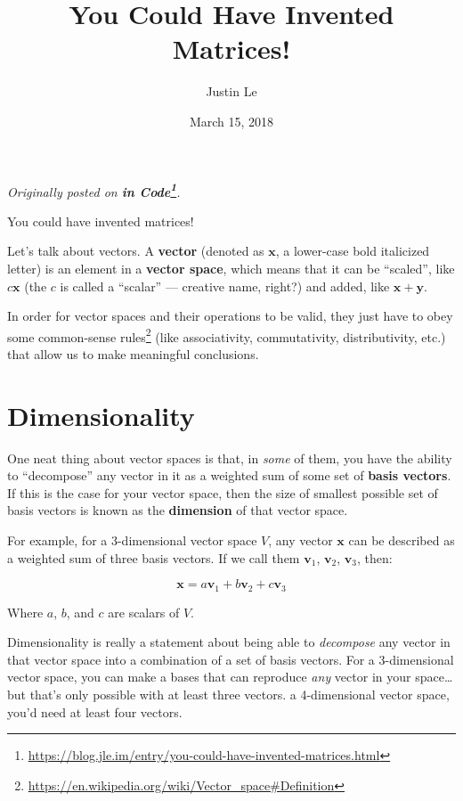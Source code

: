\documentclass[]{article}
\title{You Could Have Invented Matrices!}
\author{Justin Le}
\date{March 15, 2018}
\renewcommand{\href}[2]{#2\footnote{\url{#1}}}
\begin{document}
\maketitle

\emph{Originally posted on
\textbf{\href{https://blog.jle.im/entry/you-could-have-invented-matrices.html}{in
Code}}.}

You could have invented matrices!

Let's talk about vectors. A \textbf{vector} (denoted as \(\mathbf{x}\), a
lower-case bold italicized letter) is an element in a \textbf{vector space},
which means that it can be ``scaled'', like \(c \mathbf{x}\) (the \(c\) is
called a ``scalar'' --- creative name, right?) and added, like
\(\mathbf{x} + \mathbf{y}\).

In order for vector spaces and their operations to be valid, they just have to
obey some
\href{https://en.wikipedia.org/wiki/Vector_space\#Definition}{common-sense
rules} (like associativity, commutativity, distributivity, etc.) that allow us
to make meaningful conclusions.

\hypertarget{dimensionality}{%
\section{Dimensionality}\label{dimensionality}}

One neat thing about vector spaces is that, in \emph{some} of them, you have the
ability to ``decompose'' any vector in it as a weighted sum of some set of
\textbf{basis vectors}. If this is the case for your vector space, then the size
of smallest possible set of basis vectors is known as the \textbf{dimension} of
that vector space.

For example, for a 3-dimensional vector space \(V\), any vector \(\mathbf{x}\)
can be described as a weighted sum of three basis vectors. If we call them
\(\mathbf{v}_1\), \(\mathbf{v}_2\), \(\mathbf{v}_3\), then:

\[
\mathbf{x} = a \mathbf{v}_1 + b \mathbf{v}_2 + c \mathbf{v}_3
\]

Where \(a\), \(b\), and \(c\) are scalars of \(V\).

Dimensionality is really a statement about being able to \emph{decompose} any
vector in that vector space into a combination of a set of basis vectors. For a
3-dimensional vector space, you can make a bases that can reproduce \emph{any}
vector in your space\ldots but that's only possible with at least three vectors.
a 4-dimensional vector space, you'd need at least four vectors.
\end{document}
